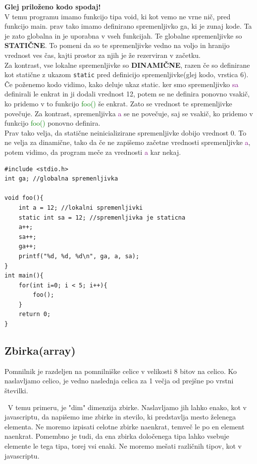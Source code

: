 \documentclass[a4paper, 12pt]{article}
\begin{document}
\textbf{Glej priloženo kodo spodaj!}\\
V temu programu imamo funkcijo tipa void, ki kot vemo ne vrne nič, pred funkcijo main. prav tako imamo definirano spremenljivko ga, ki je zunaj kode. Ta je zato globalna in je uporabna v vseh funkcijah. Te globalne spremenljivke so \textbf{STATIČNE}. To pomeni da so te spremenljivke vedno na voljo in hranijo vrednost ves čas, kajti prostor za njih je že rezerviran v začetku.\\
Za kontrast, vse lokalne spremenljivke so \textbf{DINAMIČNE}, razen če so definirane kot statične z ukazom \lstinline|static| pred definicijo spremenljivke(glej kodo, vrstica 6). Če poženemo kodo vidimo, kako deluje ukaz static. ker smo spremenljivko \textcolor{purple}{sa} definirali le enkrat in ji dodali vrednost 12, potem se ne definira ponovno vsakič, ko pridemo v to funkcijo \textcolor{green}{foo()} še enkrat. Zato se vrednost te spremenljivke povečuje. Za kontrast, spremenljivka \textcolor{purple}{a} se ne povečuje, saj se vsakič, ko pridemo v funkcijo \textcolor{green}{foo()} ponovno definira.\\
Prav tako velja, da statične neinicializirane spremenljivke dobijo vrednost 0. To ne velja za dinamične, tako da če ne zapišemo začetne vrednosti spremenljivke \textcolor{purple}{a}, potem vidimo, da program meče za vrednosti \textcolor{purple}{a} kar nekaj.

\begin{lstlisting}
#include <stdio.h>
int ga; //globalna spremenljivka

void foo(){
	int a = 12;	//lokalni spremenljivki
	static int sa = 12; //spremenljivka je staticna
	a++;
	sa++;
	ga++;
	printf("%d, %d, %d\n", ga, a, sa);
}
int main(){
	for(int i=0; i < 5; i++){
		foo();
	}
	return 0;
}	
\end{lstlisting}

\subsection{Zbirka(array)}
Pomnilnik je razdeljen na pomnilniške celice v velikosti 8 bitov na celico. Ko naslavljamo celico, je vedno naslednja celica za 1 večja od prejšne po vrstni številki. \

{\centering{}\par}\
V temu primeru, je "dim" dimenzija zbirke. Naslavljamo jih lahko enako, kot v javascriptu, da napišemo ime zbirke in stevilo, ki predstavlja mesto želenega elementa. Ne moremo izpisati celotne zbirke naenkrat, temveč le po en element naenkrat. Pomembno je tudi, da ena zbirka določenega tipa lahko vsebuje elemente le tega tipa, torej vsi enaki. Ne moremo mešati različnih tipov, kot v javascriptu.
\end{document}
